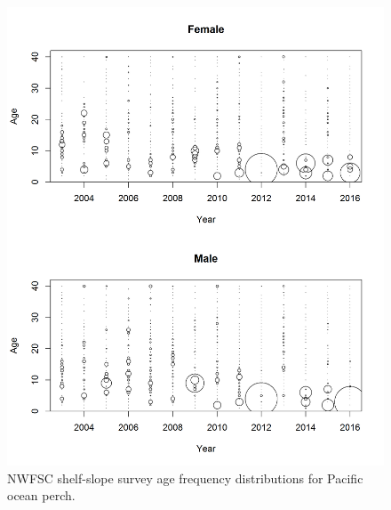 \documentclass[12pt,]{article}
\begin{document}
\begin{figure}
\centering
\includegraphics{Figures/NWFSCcombo_Ages.png}
\caption{NWFSC shelf-slope survey age frequency distributions for
Pacific ocean perch. \label{fig:nw_Age}}
\end{figure}

\FloatBarrier
\end{document}
